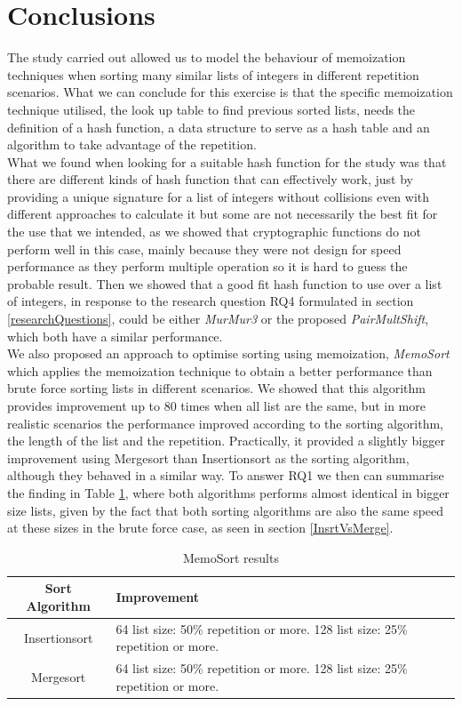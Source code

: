 \documentclass[a4paper,12pt]{article}
\begin{document}
\section{Conclusions}
The study carried out  allowed us to model the behaviour of memoization techniques when sorting many similar lists of integers in different repetition scenarios. What we can conclude for this exercise is that the specific memoization technique utilised, the look  up table to find previous sorted lists, needs the definition of a hash function, a data structure to serve as a hash table and an algorithm to take advantage of the repetition.\\

What we found when looking for a suitable hash function for the study was that there are different kinds of hash function that can effectively work, just by providing a unique signature for a list of integers without collisions even with different approaches to calculate it but some are not necessarily the best fit for the use that we intended, as we showed that cryptographic functions do not perform well in this case, mainly because they were not design for speed performance as they perform multiple operation so it is hard to guess the probable result. Then we showed that a good fit hash function to use over a list of integers, in response to the research question RQ4 formulated in section \ref{researchQuestions}, could be either  {\it MurMur3}  or the proposed  {\it PairMultShift}, which both have a similar performance.\\

We also proposed an approach to optimise sorting using memoization, {\it MemoSort} which applies the memoization technique to obtain a better performance than brute force sorting lists in different scenarios. We showed that this algorithm provides improvement up to 80 times when all list are the same, but in more realistic scenarios the performance improved according to the sorting algorithm, the length of the list and the repetition. Practically, it provided a slightly bigger improvement using Mergesort than Insertionsort as the sorting algorithm, although they behaved in a similar way. To answer RQ1 we then can summarise the finding in Table \ref{fig:MemoSortResults}, where both algorithms performs almost identical in bigger size lists, given by the fact that both sorting algorithms are also the same speed at these sizes in the brute force case, as seen in section \ref{InsrtVsMerge}.

\begin{table}[H]
\centering
\begin{tabular}{|c|p{70mm}|}   \hline
	{Sort Algorithm} & {Improvement} \\  \hline
	Insertionsort & 64 list size: 50\% repetition or more. 128 list size: 25\% repetition or more.\\ 
	Mergesort & 64 list size: 50\% repetition or more. 128 list size: 25\% repetition or more. \\  \hline
\end{tabular}
\caption{MemoSort results}
\label{fig:MemoSortResults}
\end{table}
\end{document}
